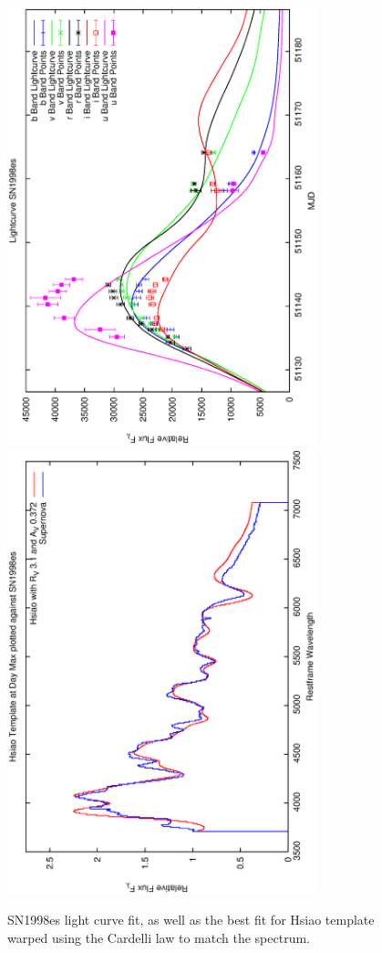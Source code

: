 \clearpage

\begin{figure}[p]
\centering
\includegraphics[angle=-90,width=0.8\textwidth]{./figures/ltcv/SN1998es_v024_lightcurve.ps}
\hfill
\includegraphics[angle=-90,width=0.8\textwidth]{./figures/hsiao/SN1998es_v001_hsiao.ps}
\hfill
\caption{SN1998es light curve fit, as well as the best fit for Hsiao template warped using the Cardelli law to match the spectrum.}
\label{fig:SN1998esfour2}
\end{figure}

